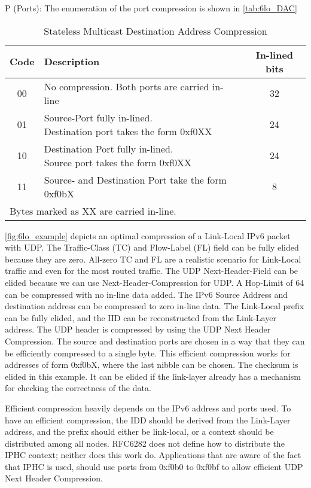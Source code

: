 P (Ports):
The enumeration of the port compression is shown in \autoref{tab:6lo_DAC}

\begin{table}[h!]
	\centering
	\caption{Stateless Multicast Destination Address Compression}
	\begin{tabular}{|c|l|c|} \hline
	Code & Description                                            & In-lined bits\\ \hline \hline
	00   & No compression. Both ports are carried in-line         & 32 \\ \hline
	01   & \makecell[l]{Source-Port fully in-lined.\\
	                    Destination port takes the form 0xf0XX}   & 24  \\ \hline
	10   & \makecell[l]{Destination Port fully in-lined.\\
	                    Source port takes the form 0xf0XX}        & 24  \\ \hline
	11   & Source- and Destination Port take the form 0xf0bX      & 8   \\ \hline
	\multicolumn{3}{l}{Bytes marked as XX are carried in-line.}\\
	\end{tabular}
	\label{tab:6lo_DAC}
\end{table}



\autoref{fig:6lo_example} depicts an optimal compression of a Link-Local IPv6 packet with UDP.
The Traffic-Class (TC) and Flow-Label (FL) field can be fully elided because they are zero.
All-zero TC and FL are a realistic scenario for Link-Local traffic and even for the most routed traffic.
The UDP Next-Header-Field can be elided because we can use Next-Header-Compression for UDP.
A Hop-Limit of 64 can be compressed with no in-line data added.
The IPv6 Source Address and destination address can be compressed to zero in-line data.
The Link-Local prefix can be fully elided, and the IID can be reconstructed from the Link-Layer address.
The UDP header is compressed by using the UDP Next Header Compression.
The source and destination ports are chosen in a way that they can be efficiently compressed to a single byte.
This efficient compression works for addresses of form 0xf0bX, where the last nibble can be chosen.
The checksum is elided in this example.
It can be elided if the link-layer already has a mechanism for checking the correctness of the data.

Efficient compression heavily depends on the IPv6 address and ports used.
To have an efficient compression, the IDD should be derived from the Link-Layer address,
and the prefix should either be link-local, or a context should be distributed among all nodes.
RFC6282 does not define how to distribute the IPHC context; neither does this work do.
Applications that are aware of the fact that IPHC is used,
should use ports from 0xf0b0 to 0xf0bf to allow efficient UDP Next Header Compression.

